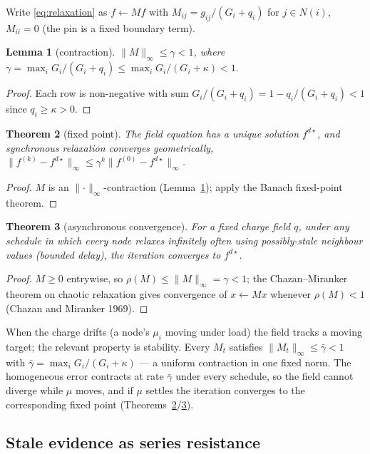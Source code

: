\documentclass[11pt]{article}
\theoremstyle{plain}
\newtheorem{theorem}{Theorem}[section]
\newtheorem{lemma}[theorem]{Lemma}
\numberwithin{equation}{section}
\begin{document}
Write \eqref{eq:relaxation} as $f\leftarrow Mf$ with $M_{ij}=g_{ij}/(G_i+q_i)$ for $j\in N(i)$, $M_{ii}=0$ (the pin is a fixed boundary term).

\begin{lemma}[contraction]\label{lem:contraction}
$\lVert M\rVert_\infty\le\gamma<1$, where $\gamma=\max_i G_i/(G_i+q_i)\le\max_i G_i/(G_i+\kappa)<1.$
\end{lemma}
\begin{proof}
Each row is non-negative with sum $G_i/(G_i+q_i)=1-q_i/(G_i+q_i)<1$ since $q_i\ge\kappa>0$.
\end{proof}

\begin{theorem}[fixed point]\label{thm:fixedpoint}
The field equation has a unique solution $f^{d\star}$, and synchronous relaxation converges geometrically, $\lVert f^{(k)}-f^{d\star}\rVert_\infty\le\gamma^k\lVert f^{(0)}-f^{d\star}\rVert_\infty$.
\end{theorem}
\begin{proof}
$M$ is an $\lVert\cdot\rVert_\infty$-contraction (Lemma~\ref{lem:contraction}); apply the Banach fixed-point theorem.
\end{proof}

\begin{theorem}[asynchronous convergence]\label{thm:async}
For a fixed charge field $q$, under any schedule in which every node relaxes infinitely often using possibly-stale neighbour values (bounded delay), the iteration converges to $f^{d\star}$.
\end{theorem}
\begin{proof}
$M\ge 0$ entrywise, so $\rho(M)\le\lVert M\rVert_\infty=\gamma<1$; the Chazan–Miranker theorem on chaotic relaxation gives convergence of $x\leftarrow Mx$ whenever $\rho(M)<1$ (Chazan and Miranker 1969).
\end{proof}

When the charge drifts (a node's $\mu_i$ moving under load) the field tracks a moving target; the relevant property is stability. Every $M_t$ satisfies $\lVert M_t\rVert_\infty\le\bar\gamma<1$ with $\bar\gamma=\max_i G_i/(G_i+\kappa)$ — a uniform contraction in one fixed norm. The homogeneous error contracts at rate $\bar\gamma$ under every schedule, so the field cannot diverge while $\mu$ moves, and if $\mu$ settles the iteration converges to the corresponding fixed point (Theorems~\ref{thm:fixedpoint}/\ref{thm:async}).

\subsection{Stale evidence as series resistance}\label{sec:stale-evidence}
\end{document}
